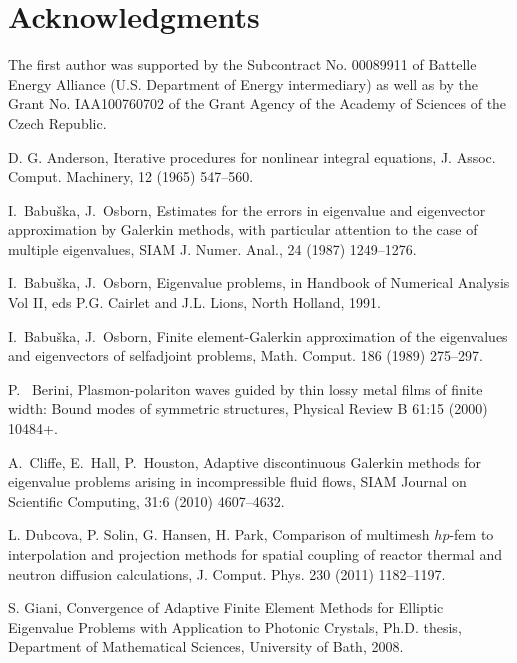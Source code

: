 \documentclass[preprint,12pt]{elsarticle}
\begin{document}
\section*{Acknowledgments}
The first author was supported by the Subcontract No. 00089911 of Battelle Energy
Alliance (U.S. Department of Energy intermediary) as well as by the Grant No. 
IAA100760702 of the Grant Agency of the Academy of Sciences of the Czech Republic.

 
 
\begin{thebibliography}{10} 
{\sc D. G. Anderson,} 
 { Iterative procedures for nonlinear integral equations,} 
{J. Assoc. Comput.
Machinery,} 12 (1965) 547--560.

{\sc I.~Babu\v{s}ka, J.~Osborn,} 
 { Estimates for the errors in eigenvalue and eigenvector
  approximation by Galerkin methods, with particular attention to the
  case of multiple eigenvalues}, 
{ SIAM J. Numer. Anal.}, 24 (1987) 1249--1276.

{\sc I.~Babu\v{s}ka, J.~Osborn,} 
 { Eigenvalue problems},
 in Handbook of Numerical Analysis Vol II, eds P.G. Cairlet and J.L. Lions, North Holland, 1991.

{\sc I.~Babu\v{s}ka, J.~Osborn,} 
 { Finite element-Galerkin approximation of the
  eigenvalues and eigenvectors of selfadjoint problems}, 
{ Math. Comput.} 186 (1989) 275--297.

{\sc P.~ Berini,}
	{ Plasmon-polariton waves guided by thin lossy metal films of finite width: 
	Bound modes of symmetric structures},
	{ Physical Review B} 61:15 (2000) 10484+.

{\sc A.~Cliffe, E.~Hall, P.~Houston,}
	{ Adaptive discontinuous Galerkin methods for eigenvalue problems arising in 
	incompressible fluid flows},
	{ {SIAM} Journal on Scientific Computing}, 31:6 (2010)  4607--4632.

{\sc L. Dubcova, P. Solin, G. Hansen, H. Park,}
{ Comparison of multimesh $hp$-fem 
to interpolation and projection methods for spatial coupling of reactor 
thermal and neutron diffusion calculations}, 
{J. Comput. Phys.} 230 (2011)  1182--1197.

{\sc S. Giani,}
{ Convergence of Adaptive Finite Element Methods for Elliptic
Eigenvalue Problems with Application to
Photonic Crystals},
{Ph.D. thesis, Department of Mathematical Sciences, University of Bath, 2008}.


\end{thebibliography}
\end{document}
